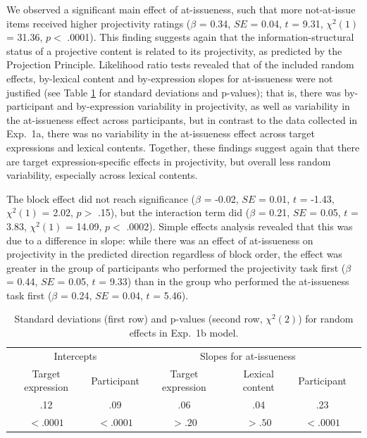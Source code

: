 \documentclass[11pt,fleqn]{article}
\newcommand{\6}{\mbox{$[\hspace*{-.6mm}[$}}
\newcommand{\9}{\mbox{$]\hspace*{-.6mm}]$}}
\newcommand{\tableref}[1]{Table \ref{#1}}
\begin{document}
We observed a significant main effect of at-issueness, such that more not-at-issue items received higher projectivity ratings ($\beta$ = 0.34, $SE$ = 0.04, $t$ = 9.31, $\chi^2(1)$ = 31.36, $p <$ .0001). This finding suggests again that the information-structural status of a projective content is related to its projectivity, as predicted by the Projection Principle. Likelihood ratio tests revealed that of the included random effects, by-lexical content and by-expression slopes for at-issueness were not justified (see \tableref{tab:random1b} for standard deviations and p-values); that is, there was by-participant and by-expression variability in projectivity, as well as variability in the at-issueness effect across participants, but in contrast to the data collected in Exp.~1a, there was no variability in the at-issueness effect across target expressions and lexical contents. Together, these findings suggest again that there are target expression-specific effects in projectivity, but overall less random variability, especially across lexical contents. 

The block effect did not reach significance ($\beta$ = -0.02, $SE$ = 0.01, $t$ = -1.43, $\chi^2(1)$ = 2.02, $p >$ .15), but the interaction term did ($\beta$ = 0.21, $SE$ = 0.05, $t$ = 3.83, $\chi^2(1)$ = 14.09, $p <$ .0002). Simple effects analysis revealed that this was due to a difference in slope: while there was an effect of at-issueness on projectivity in the predicted direction regardless of block order, the effect was greater in the group of participants who performed the projectivity task first ($\beta$ = 0.44, $SE$ = 0.05, $t$ = 9.33) than in the group who performed the at-issueness task first ($\beta$ = 0.24, $SE$ = 0.04, $t$ = 5.46).


\begin{table}
\begin{center}
\begin{tabular}{c c c c c c }
\toprule
\multicolumn{2}{c}{Intercepts} & \multicolumn{3}{c}{Slopes for at-issueness}\\
Target expression & Participant & Target expression & Lexical content & Participant\\
\midrule
.12 & .09 & .06 & .04 & .23\\
$< .0001$ & $< .0001$ & $> .20$ & $> .50$ & $< .0001$ \\
\bottomrule
\end{tabular}
\caption{Standard deviations (first row) and p-values (second row, $\chi^2(2)$) for random effects in Exp.~1b model.}\label{tab:random1b}
\end{center}
\end{table}
\end{document}
